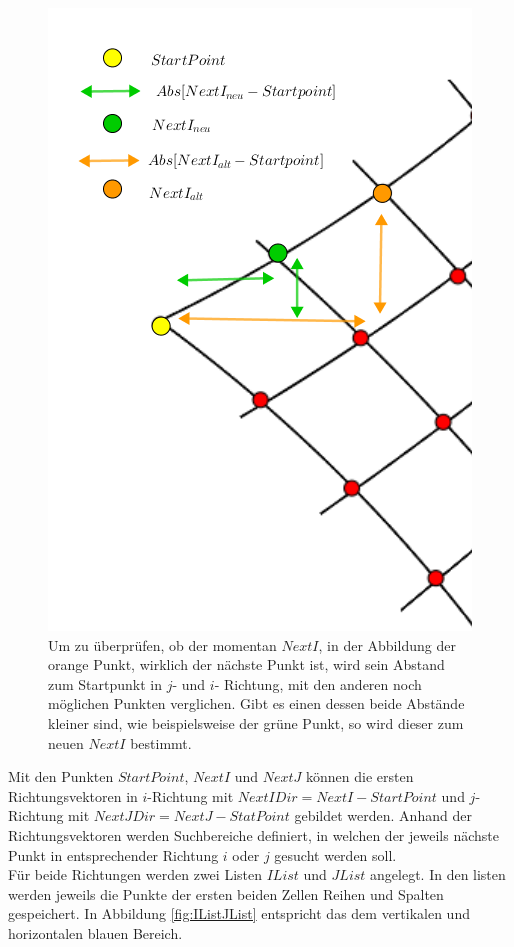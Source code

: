 \begin{figure}[!htb]
	\centering
	\includegraphics[width=0.5\linewidth]{images/SearchNextI.png}
	\caption[Überprüfung des gefundenen $NextI$]{Um zu überprüfen, ob der momentan $NextI$, in der Abbildung der orange Punkt, wirklich der nächste Punkt ist, wird sein Abstand zum Startpunkt in $j$- und  $i$- Richtung, mit den anderen noch möglichen Punkten verglichen. Gibt es einen dessen beide Abstände kleiner sind, wie beispielsweise der grüne Punkt, so wird dieser zum neuen $NextI$ bestimmt.}
	\label{fig:FindNextIJ}
\end{figure}
\pagebreak


Mit den Punkten $StartPoint$, $NextI$ und $NextJ$ können die ersten Richtungsvektoren in $i$-Richtung mit $NextIDir= NextI - StartPoint$ und $j$- Richtung mit $NextJDir =NextJ-StatPoint$ gebildet werden. Anhand der Richtungsvektoren werden Suchbereiche definiert, in welchen der jeweils nächste Punkt in entsprechender Richtung $i$ oder $j$ gesucht werden soll.\\ 


Für beide Richtungen werden zwei Listen $IList$ und $JList$ angelegt. In den listen werden jeweils die Punkte der ersten beiden Zellen Reihen und Spalten gespeichert. In Abbildung \ref{fig:IListJList} entspricht das dem vertikalen und horizontalen blauen Bereich. \\


